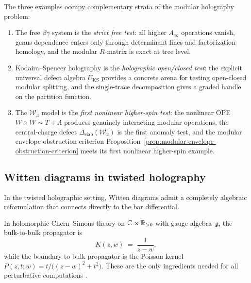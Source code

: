 \begin{remark}
\label{rem:three-atoms-organization}
The three examples occupy complementary strata of the modular holography problem:
\begin{enumerate}[label=\textup{(\roman*)}]
\item The free $\beta\gamma$ system is the \emph{strict free test}: all higher
 $A_\infty$ operations vanish, genus dependence enters only through determinant lines
 and factorization homology, and the modular $R$-matrix is exact at tree level.
\item Kodaira--Spencer holography is the \emph{holographic open/closed test}: the
 explicit universal defect algebra $U_{\mathrm{KS}}$ provides a concrete arena for
 testing open-closed modular splitting, and the single-trace decomposition gives a
 graded handle on the partition function.
\item The $\mathcal{W}_3$ model is the \emph{first nonlinear higher-spin test}: the
 nonlinear OPE $W \times W \sim T + \Lambda$ produces genuinely interacting modular
 operations, the central-charge defect $\Delta_{\mathrm{slab}}(\mathcal W_3)$ is the
 first anomaly test, and the modular envelope obstruction criterion
 Proposition~\ref{prop:modular-envelope-obstruction-criterion} meets its first nonlinear
 higher-spin example.
\end{enumerate}
\end{remark}


\subsection{Witten diagrams in twisted holography}
\label{subsec:witten-diagrams-twisted}

In the twisted holographic setting, Witten diagrams admit a completely
algebraic reformulation that connects directly to the bar differential.

\begin{definition}
\label{def:twisted-propagator}
In holomorphic Chern--Simons theory on $\mathbb C \times \mathbb R_{>0}$ with gauge
algebra~$\mathfrak{g}$, the bulk-to-bulk propagator is
\begin{equation}\label{eq:hcs-propagator}
K(z,w) \;=\; \frac{1}{z - w},
\end{equation}
while the boundary-to-bulk propagator is the Poisson kernel
$P(z,t;w) = t/\bigl((z-w)^2 + t^2\bigr)$. These are the only
ingredients needed for all perturbative computations \cite{CG18}.
\end{definition}

